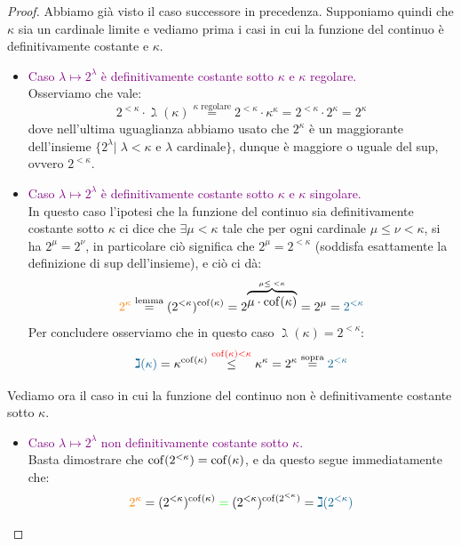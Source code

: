\begin{proof}
	Abbiamo gi\`a visto il caso successore in precedenza. Supponiamo quindi che $\kappa$ sia un cardinale limite e vediamo prima i casi in cui 
	la funzione del continuo \`e definitivamente costante e $\kappa$.
	\begin{itemize}
		\item \textcolor{purple}{Caso $\lambda \mapsto 2^\lambda$ \`e definitivamente costante sotto $\kappa$ e $\kappa$ regolare.}\\
		Osserviamo che vale:
		\[ 2^{<\kappa} \cdot \gimel(\kappa) \overset{\text{$\kappa$ regolare}}{=} 2^{<\kappa} \cdot \kappa^\kappa = 2^{<\kappa} \cdot 2^\kappa = 2^\kappa
			\]
		dove nell'ultima uguaglianza abbiamo usato che $2^{\kappa}$ \`e un maggiorante dell'insieme $\{2^{\lambda} | \;\text{$\lambda < \kappa$ e $\lambda$ cardinale}\}$, dunque \`e maggiore o uguale del sup, ovvero $2^{<\kappa}$.
		\item \textcolor{purple}{Caso $\lambda \mapsto 2^\lambda$ \`e definitivamente costante sotto $\kappa$ e $\kappa$ singolare.}\\
		In questo caso l'ipotesi che la funzione del continuo sia definitivamente costante sotto $\kappa$ ci dice che $\exists \mu < \kappa$ tale che per ogni cardinale $\mu \leq \nu < \kappa$, si ha $2^{\mu} = 2^{\nu}$, in particolare ci\`o significa che $2^{\mu} = 2^{<\kappa}$ (soddisfa esattamente la definizione di sup 
		dell'insieme), e ci\`o ci d\`a:
		\[ \textcolor{orange}{2^\kappa} \overset{\text{lemma}}{=} (2^{<\kappa})^{\cof(\kappa)} = 2^{\overbrace{\mu \cdot \cof(\kappa)}^{\mu \leq \;< \kappa}} = 2^\mu = \textcolor{MidnightBlue}{2^{<\kappa}} 
			\]
		Per concludere osserviamo che in questo caso $\gimel(\kappa) = 2^{<\kappa}$:
		\[ \textcolor{MidnightBlue}{\gimel(\kappa)} = {\kappa}^{\cof(\kappa)} \overset{\textcolor{red}{\cof(\kappa) < \kappa}}{\leq} \kappa^{\kappa} = 2^\kappa \overset{\text{sopra}}{=} \textcolor{MidnightBlue}{2^{<\kappa}}
			\]
	\end{itemize}
	Vediamo ora il caso in cui la funzione del continuo non \`e definitivamente costante sotto $\kappa$.
	\begin{itemize}
		\item \textcolor{purple}{Caso $\lambda \mapsto 2^\lambda$ non definitivamente costante sotto $\kappa$.}\\
		Basta dimostrare che \textcolor{green}{$\operatorname{cof}(2^{<\kappa}) = \operatorname{cof}(\kappa)$}, e da questo segue immediatamente che:
		\[ \textcolor{orange}{2^\kappa} = (2^{<\kappa})^{\cof(\kappa)}\; \textcolor{green}{=}\; (2^{<\kappa})^{\cof(2^{<\kappa})} = \textcolor{MidnightBlue}{\gimel(2^{<\kappa})}
\]
\end{itemize}
\end{proof}
